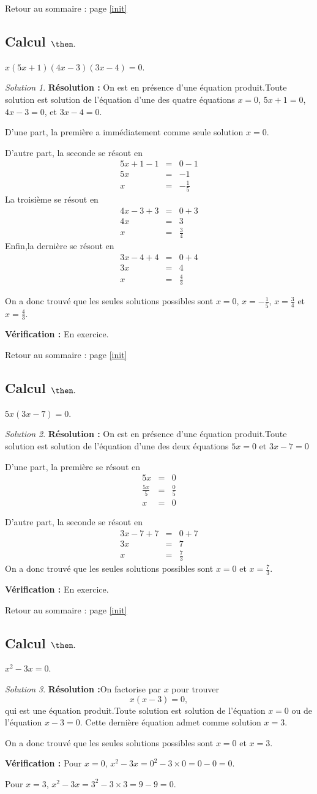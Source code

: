 \documentclass[14pt]{article}
\theoremstyle{remark}
\newtheorem*{sol}{Solution}
\newcounter{n}
\renewcommand{\it}{Retour au sommaire : page \ref{init}
	\subsection{Calcul $ \mathbf{ \then}.$}\label{\then} \stepcounter{n} }
\theoremstyle{plain}
\begin{document}
\it $x(5x+1)(4x-3)(3x-4)=0$. 
\begin{sol}
\textbf{Résolution :}
On est en présence d'une équation produit.Toute solution est solution de l'équation d'une des quatre équations $x=0$, $5x+1=0$, $4x-3=0$, et $3x-4=0$. 

D'une part, la première a immédiatement comme seule solution $x=0$. 

D'autre part, la seconde se résout en 
\begin{eqnarray*}
5x+1 -1 &=&0-1 \\
5x&=& -1\\
x&=& -\frac15
\end{eqnarray*}
La troisième se résout en 
\begin{eqnarray*}
4x-3+3 &=&0+3 \\
4x&=& 3\\
x&=& \frac34
\end{eqnarray*}
Enfin,la dernière se résout en 
\begin{eqnarray*}
3x-4+4 &=& 0+4\\
3x &=& 4\\
x&=& \frac43
\end{eqnarray*}

On a donc trouvé que les seules solutions possibles sont $x=0$, $x=-\frac15$, $x=\frac34$ et $x=\frac43$. 


\textbf{Vérification :} En exercice. 
\end{sol}
\it $5x(3x-7)=0$.  
\begin{sol}
\textbf{Résolution :}
On est en présence d'une équation produit.Toute solution est solution de l'équation d'une des deux équations $5x=0$ et $3x-7=0$

D'une part, la première se résout en 
\begin{eqnarray*} 5x &=& 0 \\
\frac{5x}5 &=& \frac05\\
x&=&0\end{eqnarray*}

D'autre part, la seconde se résout en 
\begin{eqnarray*}
3x-7+7&=&0+7\\
3x &=& 7\\
x &=& \frac73
\end{eqnarray*}
On a donc trouvé que les seules solutions possibles sont $x=0$ et $x=\frac73$. 


\textbf{Vérification :} En exercice. 
\end{sol} 
\it $x^2-3x=0$. 
\begin{sol}
\textbf{Résolution :}On factorise par $x$ pour trouver \[x(x-3)=0,\]
qui est une équation produit.Toute solution est solution de l'équation $x=0$ ou de l'équation $x-3=0$. Cette dernière équation admet comme solution $x=3$. 

On a donc trouvé que les seules solutions possibles sont $x=0$ et $x=3$. 


\textbf{Vérification :} Pour $x=0$, $x^2-3x=0^2-3\times0=0-0=0$.

Pour $x=3$, $x^2-3x=3^2-3\times3=9-9=0$.
\end{sol}
\end{document}
